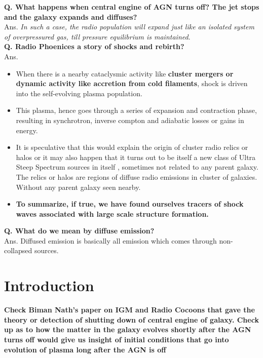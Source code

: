 \documentclass[11pt]{report}
\newcommand{\tbf}[1]{\textbf{#1}}
\newcommand{\tit}[1]{\textit{#1}}
\newcommand{\cbox}{tcolorbox}
\begin{document}
 \tbf{Q. What happens when central engine of AGN turns off? The jet stops and the galaxy expands and diffuses?}\\
Ans. \tit{ In such a case, the radio population will expand just like an isolated system of overpressured gas, till pressure equilibrium is maintained}. \\

\tbf{Q. Radio Phoenices a story of shocks and rebirth?}\\
Ans. 
\begin{itemize}
\item When there is a nearby cataclysmic activity like \tbf{cluster mergers or dynamic activity like accretion from cold filaments}, shock is driven into the self-evolving plasma population. 
\item This  plasma, hence goes through a series of expansion and contraction phase, resulting in synchrotron, inverse compton and adiabatic losses or gains in energy. 
\item It is speculative that this would explain the origin of cluster radio relics or halos or it may also happen that it turns out to be itself a new class of Ultra Steep Spectrum sources in itself , sometimes not related to any parent galaxy. The relics or halos are regions of diffuse radio emissions in cluster of galaxies. Without any parent galaxy seen nearby.
\item \tbf{To summarize, if true, we have found ourselves tracers of shock waves associated with large scale structure formation.}\\
\end{itemize}

\tbf{Q. What do we mean by diffuse emission?}\\
Ans. Diffused emission is basically all emission which comes through non-collapsed sources.


\section{Introduction}
\begin{\cbox}
\tbf{Check Biman Nath's paper on IGM and Radio Cocoons that gave the theory or detection of shutting down of central engine of galaxy. Check up as to how the matter in the galaxy evolves shortly after the AGN turns off would give us insight of initial conditions that go into evolution of plasma long after the AGN is off}\\
\end{\cbox}
\end{document}
